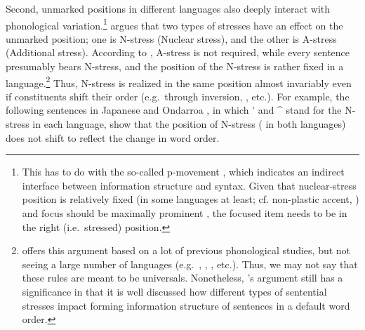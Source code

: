 Second, unmarked  positions in different languages also
deeply interact with phonological variation.\footnote{This has to do
  with the so-called p-movement \citep{zubizarreta:98}, which
  indicates an indirect interface between information structure and
  syntax. Given that nuclear-stress position is relatively fixed (in
  some languages at least; cf. non-plastic accent,
  \citealt{vallduvi:90}) and focus should be maximally prominent
  \citep{buring:10}, the focused item needs to be in the right
  (i.e.\ stressed) position.}  \citet{ishihara:01} argues that two
types of stresses have an effect on the unmarked position; one is
N-stress (Nuclear stress), and the other is A-stress (Additional
stress). According to \citeauthor{ishihara:01}, A-stress is not
required, while every sentence presumably bears N-stress, and the
position of the N-stress is rather fixed in a
language.\footnote{\citet{ishihara:01} offers this argument based on a
  lot of previous phonological studies, but not seeing a large number
  of languages (e.g.\ , , ,
  etc.). Thus, we may not say that these rules are meant to be
  universals. Nonetheless, \citeauthor{ishihara:01}'s argument still
  has a significance in that it is well discussed how different types
  of sentential stresses impact forming information structure of
  sentences in a default word order.}  Thus, N-stress is realized in
the same position almost invariably even if constituents shift their
order (e.g.\ through inversion, , etc.). For example,
the following sentences in Japanese  and
Ondarroa  , in which
\'{\xspace} and \^{\xspace} stand for the N-stress in each language,
show that the position of N-stress ( in both languages)
does not shift to reflect the change in word order.






